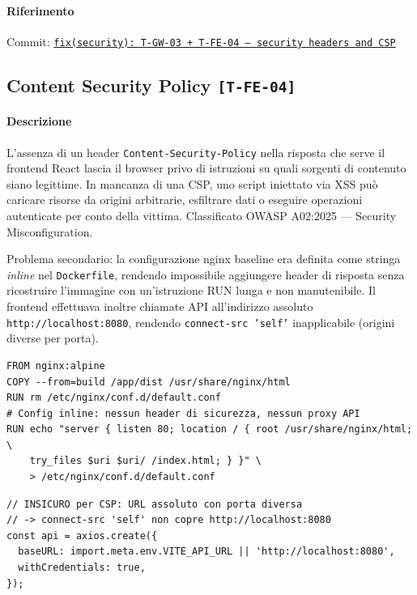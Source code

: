 ﻿\documentclass[a4paper,12pt]{report}
\newcommand{\commitref}[2]{\texttt{\small \href{https://github.com/diegoandruccioli/hotel-pms/commit/#1}{#2}}}
\newcommand{\threat}[1]{\texttt{\small\textcolor{vulnred}{[#1]}}}
\begin{document}
\paragraph{Riferimento} Commit: \commitref{b901a9f}{fix(security): T-GW-03 + T-FE-04 --- security headers and CSP}


\subsection{Content Security Policy \threat{T-FE-04}}

\paragraph{Descrizione}
L'assenza di un header \texttt{Content-Security-Policy} nella risposta che serve il frontend
React lascia il browser privo di istruzioni su quali sorgenti di contenuto siano legittime.
In mancanza di una CSP, uno script iniettato via XSS può caricare risorse da origini
arbitrarie, esfiltrare dati o eseguire operazioni autenticate per conto della vittima.
Classificato OWASP A02:2025 --- Security Misconfiguration.

Problema secondario: la configurazione nginx baseline era definita come stringa \emph{inline}
nel \texttt{Dockerfile}, rendendo impossibile aggiungere header di risposta senza ricostruire
l'immagine con un'istruzione RUN lunga e non manutenibile. Il frontend effettuava inoltre
chiamate API all'indirizzo assoluto \texttt{http://localhost:8080}, rendendo \texttt{connect-src
'self'} inapplicabile (origini diverse per porta).

\begin{insecurebox}[title={Dockerfile baseline --- nginx inline senza header di sicurezza}]
\begin{lstlisting}[style=yaml]
FROM nginx:alpine
COPY --from=build /app/dist /usr/share/nginx/html
RUN rm /etc/nginx/conf.d/default.conf
# Config inline: nessun header di sicurezza, nessun proxy API
RUN echo "server { listen 80; location / { root /usr/share/nginx/html; \
    try_files $uri $uri/ /index.html; } }" \
    > /etc/nginx/conf.d/default.conf
\end{lstlisting}
\end{insecurebox}

\begin{insecurebox}[title={api.ts baseline --- URL assoluto, incompatibile con CSP strict}]
\begin{lstlisting}[style=typescript]
// INSICURO per CSP: URL assoluto con porta diversa
// -> connect-src 'self' non copre http://localhost:8080
const api = axios.create({
  baseURL: import.meta.env.VITE_API_URL || 'http://localhost:8080',
  withCredentials: true,
});
\end{lstlisting}
\end{insecurebox}
\end{document}

